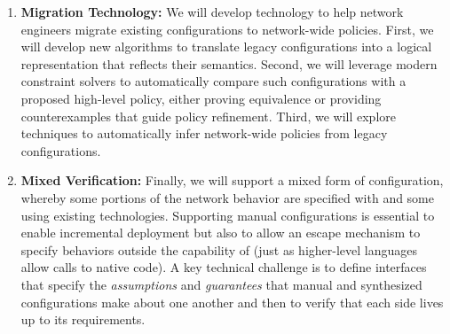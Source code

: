 \begin{enumerate}
\item {\bf Migration Technology:} We will develop technology to help network engineers migrate existing configurations to network-wide policies.  First, we will develop new algorithms to translate legacy configurations into a logical
representation that reflects their semantics.  Second, we will leverage modern constraint solvers to automatically compare such configurations with a proposed high-level policy, either proving equivalence or providing counterexamples that guide policy refinement.  Third, we will explore techniques to automatically infer network-wide policies from legacy configurations.

\item {\bf Mixed Verification:} Finally, we will support a mixed form of configuration, whereby some portions of the network behavior are specified with \Name and some using existing technologies.  Supporting manual configurations is essential to enable incremental deployment but also to allow an escape mechanism to specify behaviors outside the capability of \Name (just as higher-level languages allow calls to native code).  A key technical challenge is to define interfaces that specify the \emph{assumptions} and \emph{guarantees} that manual and synthesized configurations make about one another and then to verify that each side lives up to its requirements. 
\end{enumerate}


